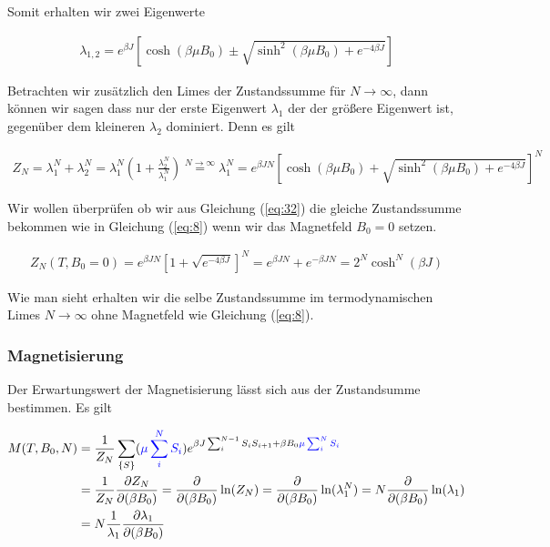 Somit erhalten wir zwei Eigenwerte

\begin{align}
  \label{eq:31}
 \lambda_{1,2}  =  e^{\beta J}\left[\cosh(\beta \mu B_0)\pm \sqrt{\sinh^2(\beta \mu B_0) + e^{-4\beta J}   } \right]
\end{align}

Betrachten wir zusätzlich den Limes der Zustandssumme für \(N\to\infty\), dann können wir sagen dass nur der erste Eigenwert \(\lambda_1\) der der größere Eigenwert ist, gegenüber dem kleineren \(\lambda_2\) dominiert. Denn es gilt

\begin{align}
  \label{eq:32}
 \boxed{ Z_N = \lambda_1^N + \lambda_2^N = \lambda_1^N\left( 1 + \frac{\lambda_2^N}{\lambda_1^N}  \right) \stackrel{N\to\infty} = \lambda_1^N = e^{\beta J N}\left[\cosh(\beta \mu B_0)+ \sqrt{\sinh^2(\beta \mu B_0) + e^{-4\beta J}   } \right]^N  }
\end{align}

Wir wollen überprüfen ob wir aus Gleichung (\ref{eq:32}) die gleiche Zustandssumme bekommen wie in Gleichung (\ref{eq:8}) wenn wir das Magnetfeld \(B_0=0\) setzen. 

\begin{align}
  \label{eq:33}
  Z_N(T,B_0=0) = e^{\beta J N}\left[1+ \sqrt{ e^{-4\beta J}   } \right]^N = e^{\beta J N}+ e^{-\beta J N} =2^N\cosh^N(\beta J)
\end{align}

Wie man sieht erhalten wir die selbe Zustandssumme im termodynamischen Limes \(N\to\infty\)  ohne Magnetfeld wie Gleichung (\ref{eq:8}).

\subsubsection*{Magnetisierung}

Der Erwartungswert der Magnetisierung lässt sich aus der Zustandsumme bestimmen. Es gilt

\begin{align}
  \label{eq:34}
  M(T,B_0,N) &= \frac{1}{Z_N}  \sum_{\{S\}} (\textcolor{blue}{\mu \sum_i^N S_i} )  e^{\beta J \sum_{i}^{N-1} S_iS_{i+1} + \beta B_0 \textcolor{blue}{\mu \sum_i^N S_i} } \notag \\
&=  \frac{1}{Z_N} \frac{\partial Z_N}{\partial (\beta B_0)} =  \frac{\partial}{\partial (\beta B_0)}\ln(Z_N) = \frac{\partial}{\partial (\beta B_0)}\ln(\lambda_1^N) = N \frac{\partial}{\partial (\beta B_0)}\ln(\lambda_1) \notag\\
&= N \frac{1}{\lambda_1} \frac{\partial \lambda_1}{\partial (\beta B_0)}
\end{align}

